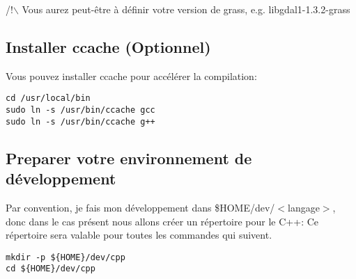 /!$\backslash$ Vous aurez peut-être à définir votre version de grass, e.g. libgdal1-1.3.2-grass

\subsection{Installer ccache (Optionnel)}
Vous pouvez installer ccache pour accélérer la compilation:

\begin{verbatim}
cd /usr/local/bin 
sudo ln -s /usr/bin/ccache gcc 
sudo ln -s /usr/bin/ccache g++ 
\end{verbatim}


\subsection{Preparer votre environnement de développement}
Par convention, je fais mon développement dans \$HOME/dev/$<$langage$>$, donc dans le cas présent nous allons créer un répertoire pour le C++: Ce répertoire sera valable pour toutes les commandes qui suivent.

\begin{verbatim}
mkdir -p ${HOME}/dev/cpp 
cd ${HOME}/dev/cpp 
\end{verbatim}

% 
% 
% 

